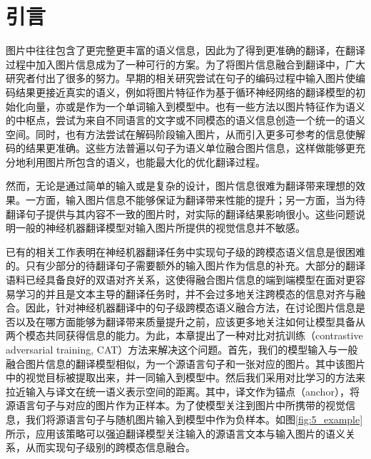 \section{引言}
图片中往往包含了更完整更丰富的语义信息，因此为了得到更准确的翻译，在翻译过程中加入图片信息成为了一种可行的方案。为了将图片信息融合到翻译中，广大研究者付出了很多的努力。早期的相关研究尝试在句子的编码过程中输入图片使编码结果更接近真实的语义，例如将图片特征作为基于循环神经网络的翻译模型的初始化向量\cite{18_DBLP:conf/emnlp/CalixtoL17,52_DBLP:journals/corr/ElliottFH15}，亦或是作为一个单词输入到模型中。也有一些方法以图片特征作为语义的中枢点，尝试为来自不同语言的文字或不同模态的语义信息创造一个统一的语义空间\cite{54_DBLP:journals/mt/NakayamaN17,68_DBLP:journals/corr/KirosSZ14}。同时，也有方法尝试在解码阶段输入图片，从而引入更多可参考的信息使解码的结果更准确\cite{36_calixto-etal-2017-doubly,47_DBLP:conf/wmt/LibovickyHM18}。这些方法普遍以句子为语义单位融合图片信息，这样做能够更充分地利用图片所包含的语义，也能最大化的优化翻译过程。

然而，无论是通过简单的输入或是复杂的设计，图片信息很难为翻译带来理想的效果。一方面，输入图片信息不能够保证为翻译带来性能的提升；另一方面，当为待翻译句子提供与其内容不一致的图片时，对实际的翻译结果影响很小。这些问题说明一般的神经机器翻译模型对输入图片所提供的视觉信息并不敏感。


已有的相关工作表明在神经机器翻译任务中实现句子级的跨模态语义信息是很困难的。只有少部分的待翻译句子需要额外的输入图片作为信息的补充。大部分的翻译语料已经具备良好的双语对齐关系，这使得融合图片信息的端到端模型在面对更容易学习的并且是文本主导的翻译任务时，并不会过多地关注跨模态的信息对齐与融合。因此，针对神经机器翻译中的句子级跨模态语义融合方法，在讨论图片信息是否以及在哪方面能够为翻译带来质量提升之前，应该更多地关注如何让模型具备从两个模态共同获得信息的能力。为此，本章提出了一种对比对抗训练（contrastive adversarial training, CAT）方法来解决这个问题。首先，我们的模型输入与一般融合图片信息的翻译模型相似，为一个源语言句子和一张对应的图片。其中该图片中的视觉目标被提取出来，并一同输入到模型中。然后我们采用对比学习的方法来拉近输入与译文在统一语义表示空间的距离。其中，译文作为锚点（anchor），将源语言句子与对应的图片作为正样本。为了使模型关注到图片中所携带的视觉信息，我们将源语言句子与随机图片输入到模型中作为负样本。如图\ref{fig:5_example}所示，应用该策略可以强迫翻译模型关注输入的源语言文本与输入图片的语义关系，从而实现句子级别的跨模态信息融合。

